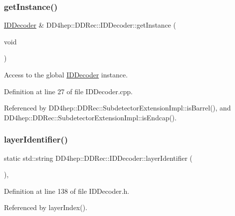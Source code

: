 \subsubsection{\texorpdfstring{get\+Instance()}{getInstance()}}
{\footnotesize\ttfamily \hyperlink{class_d_d4hep_1_1_d_d_rec_1_1_i_d_decoder}{I\+D\+Decoder} \& D\+D4hep\+::\+D\+D\+Rec\+::\+I\+D\+Decoder\+::get\+Instance (\begin{DoxyParamCaption}\item[{void}]{ }\end{DoxyParamCaption})\hspace{0.3cm}{\ttfamily [static]}}



Access to the global \hyperlink{class_d_d4hep_1_1_d_d_rec_1_1_i_d_decoder}{I\+D\+Decoder} instance. 



Definition at line 27 of file I\+D\+Decoder.\+cpp.



Referenced by D\+D4hep\+::\+D\+D\+Rec\+::\+Subdetector\+Extension\+Impl\+::is\+Barrel(), and D\+D4hep\+::\+D\+D\+Rec\+::\+Subdetector\+Extension\+Impl\+::is\+Endcap().

\hypertarget{class_d_d4hep_1_1_d_d_rec_1_1_i_d_decoder_a0eb172032d0261f4d8897f705ed94cee}{}\label{class_d_d4hep_1_1_d_d_rec_1_1_i_d_decoder_a0eb172032d0261f4d8897f705ed94cee} 
\subsubsection{\texorpdfstring{layer\+Identifier()}{layerIdentifier()}}
{\footnotesize\ttfamily static std\+::string D\+D4hep\+::\+D\+D\+Rec\+::\+I\+D\+Decoder\+::layer\+Identifier (\begin{DoxyParamCaption}{ }\end{DoxyParamCaption})\hspace{0.3cm}{\ttfamily [inline]}, {\ttfamily [static]}}



Definition at line 138 of file I\+D\+Decoder.\+h.



Referenced by layer\+Index().

\hypertarget{class_d_d4hep_1_1_d_d_rec_1_1_i_d_decoder_a4f2615fea1dbf5118127b53f4998df40}{}\label{class_d_d4hep_1_1_d_d_rec_1_1_i_d_decoder_a4f2615fea1dbf5118127b53f4998df40} 
